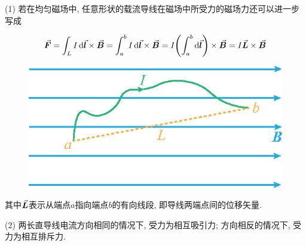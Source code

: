 \begin{note}
	
	(1) 若在均匀磁场中, 任意形状的载流导线在磁场中所受力的磁场力还可以进一步写成
	
	\begin{equation*}
		\va*{F} = \int_{L} I \dd{\va*{l}} \times \va*{B} = \int_{a}^{b} I \dd{\va*{l}} \times \va*{B} = I \qty(\int_{a}^{b} \dd{\va*{l}}) \times \va*{B} = I \va*{L} \times \va*{B}
	\end{equation*}
	
	\begin{figure}[H]
		\centering
		\includegraphics[scale=0.8]{C8-fig14.eps}
	\end{figure}
	
	其中$\va*{L}$表示从端点$a$指向端点$b$的有向线段, 即导线两端点间的位移矢量. 
	
	(2) 两长直导线电流方向相同的情况下, 受力为相互吸引力; 方向相反的情况下, 受力为相互排斥力.
	
	
\end{note}

